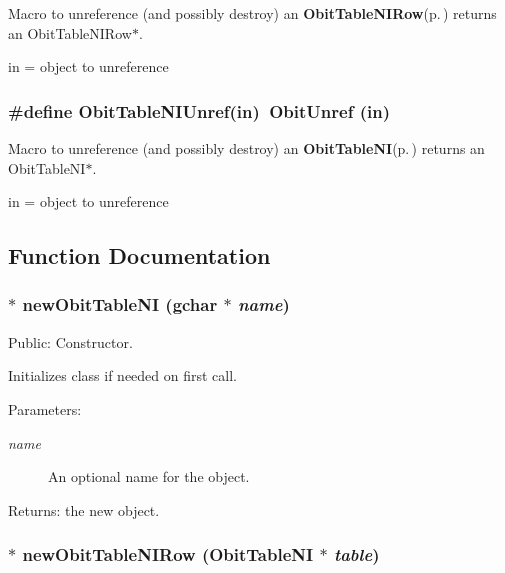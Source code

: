 Macro to unreference (and possibly destroy) an {\bf Obit\-Table\-NIRow}{\rm (p.\,\pageref{structObitTableNIRow})} returns an Obit\-Table\-NIRow$\ast$. 

in = object to unreference 
\subsubsection{\setlength{\rightskip}{0pt plus 5cm}\#define Obit\-Table\-NIUnref(in)\ Obit\-Unref (in)}\label{ObitTableNI_8h_a1}


Macro to unreference (and possibly destroy) an {\bf Obit\-Table\-NI}{\rm (p.\,\pageref{structObitTableNI})} returns an Obit\-Table\-NI$\ast$. 

in = object to unreference 

\subsection{Function Documentation}
\subsubsection{$\ast$ new\-Obit\-Table\-NI (gchar $\ast$ {\em name})}\label{ObitTableNI_8h_a11}


Public: Constructor. 

Initializes class if needed on first call. \begin{Desc}
\item[Parameters:]
\begin{description}
\item[{\em name}]An optional name for the object. \end{description}
\end{Desc}
\begin{Desc}
\item[Returns:]the new object. \end{Desc}
\subsubsection{$\ast$ new\-Obit\-Table\-NIRow ({\bf Obit\-Table\-NI} $\ast$ {\em table})}\label{ObitTableNI_8h_a8}


